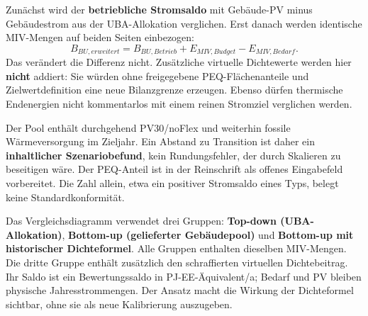 \documentclass[
  ngerman,
  a4paper,
  DIV=11]{scrreprt}
\begin{document}
Zunächst wird der \textbf{betriebliche Stromsaldo} mit Gebäude-PV minus
Gebäudestrom aus der UBA-Allokation verglichen. Erst danach werden
identische MIV-Mengen auf beiden Seiten einbezogen:
\[B_{BU,erweitert}=B_{BU,Betrieb}+E_{MIV,Budget}-E_{MIV,Bedarf}.\] Das
verändert die Differenz nicht. Zusätzliche virtuelle Dichtewerte werden
hier \textbf{nicht} addiert: Sie würden ohne freigegebene
PEQ-Flächenanteile und Zielwertdefinition eine neue Bilanzgrenze
erzeugen. Ebenso dürfen thermische Endenergien nicht kommentarlos mit
einem reinen Stromziel verglichen werden.

Der Pool enthält durchgehend PV30/noFlex und weiterhin fossile
Wärmeversorgung im Zieljahr. Ein Abstand zu Transition ist daher ein
\textbf{inhaltlicher Szenariobefund}, kein Rundungsfehler, der durch
Skalieren zu beseitigen wäre. Der PEQ-Anteil ist in der Reinschrift als
offenes Eingabefeld vorbereitet. Die Zahl allein, etwa ein positiver
Stromsaldo eines Typs, belegt keine Standardkonformität.

Das Vergleichsdiagramm verwendet drei Gruppen: \textbf{Top-down
(UBA-Allokation)}, \textbf{Bottom-up (gelieferter Gebäudepool)} und
\textbf{Bottom-up mit historischer Dichteformel}. Alle Gruppen enthalten
dieselben MIV-Mengen. Die dritte Gruppe enthält zusätzlich den
schraffierten virtuellen Dichtebeitrag. Ihr Saldo ist ein
Bewertungssaldo in PJ-EE-Äquivalent/a; Bedarf und PV bleiben physische
Jahresstrommengen. Der Ansatz macht die Wirkung der Dichteformel
sichtbar, ohne sie als neue Kalibrierung auszugeben.
\end{document}
